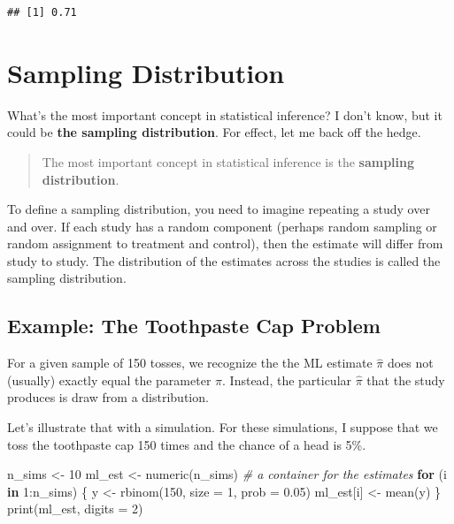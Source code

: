 \documentclass[
]{book}
\newenvironment{Shaded}{\begin{snugshade}}{\end{snugshade}}
\newcommand{\AttributeTok}[1]{\textcolor[rgb]{0.77,0.63,0.00}{#1}}
\newcommand{\CommentTok}[1]{\textcolor[rgb]{0.56,0.35,0.01}{\textit{#1}}}
\newcommand{\ControlFlowTok}[1]{\textcolor[rgb]{0.13,0.29,0.53}{\textbf{#1}}}
\newcommand{\DecValTok}[1]{\textcolor[rgb]{0.00,0.00,0.81}{#1}}
\newcommand{\FloatTok}[1]{\textcolor[rgb]{0.00,0.00,0.81}{#1}}
\newcommand{\FunctionTok}[1]{\textcolor[rgb]{0.00,0.00,0.00}{#1}}
\newcommand{\NormalTok}[1]{#1}
\newcommand{\OtherTok}[1]{\textcolor[rgb]{0.56,0.35,0.01}{#1}}
\newcommand{\SpecialCharTok}[1]{\textcolor[rgb]{0.00,0.00,0.00}{#1}}
\begin{document}
\begin{verbatim}
## [1] 0.71
\end{verbatim}

\hypertarget{sampling-distribution}{%
\section{Sampling Distribution}\label{sampling-distribution}}

What's the most important concept in statistical inference? I don't
know, but it could be \textbf{the sampling distribution}. For effect,
let me back off the hedge.

\begin{quote}
The most important concept in statistical inference is the
\textbf{sampling distribution}.
\end{quote}

To define a sampling distribution, you need to imagine repeating a study
over and over. If each study has a random component (perhaps random
sampling or random assignment to treatment and control), then the
estimate will differ from study to study. The distribution of the
estimates across the studies is called the sampling distribution.

\hypertarget{example-the-toothpaste-cap-problem}{%
\subsection{Example: The Toothpaste Cap
Problem}\label{example-the-toothpaste-cap-problem}}

For a given sample of 150 tosses, we recognize the the ML estimate
\(\hat{\pi}\) does not (usually) exactly equal the parameter \(\pi\).
Instead, the particular \(\hat{\pi}\) that the study produces is draw
from a distribution.

Let's illustrate that with a simulation. For these simulations, I
suppose that we toss the toothpaste cap 150 times and the chance of a
head is 5\%.

\begin{Shaded}
\begin{Highlighting}[]
\NormalTok{n\_sims }\OtherTok{\textless{}{-}} \DecValTok{10}
\NormalTok{ml\_est }\OtherTok{\textless{}{-}} \FunctionTok{numeric}\NormalTok{(n\_sims)  }\CommentTok{\# a container for the estimates}
\ControlFlowTok{for}\NormalTok{ (i }\ControlFlowTok{in} \DecValTok{1}\SpecialCharTok{:}\NormalTok{n\_sims) \{}
\NormalTok{  y }\OtherTok{\textless{}{-}} \FunctionTok{rbinom}\NormalTok{(}\DecValTok{150}\NormalTok{, }\AttributeTok{size =} \DecValTok{1}\NormalTok{, }\AttributeTok{prob =} \FloatTok{0.05}\NormalTok{)}
\NormalTok{  ml\_est[i] }\OtherTok{\textless{}{-}} \FunctionTok{mean}\NormalTok{(y)}
\NormalTok{\}}
\FunctionTok{print}\NormalTok{(ml\_est, }\AttributeTok{digits =} \DecValTok{2}\NormalTok{)}
\end{Highlighting}
\end{Shaded}
\end{document}
